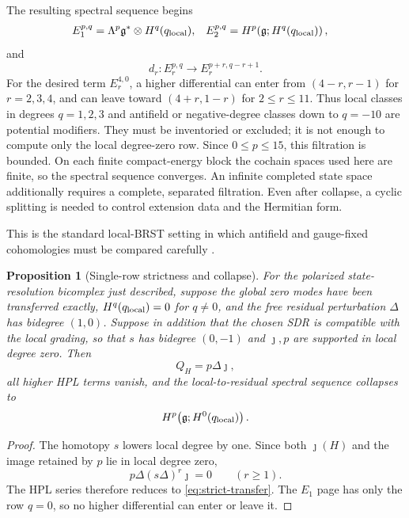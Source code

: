 \documentclass[11pt]{article}
\newtheorem{proposition}[theorem]{Proposition}
\theoremstyle{definition}
\theoremstyle{remark}
\newcommand{\g}{\mathfrak g}
\begin{document}
The resulting spectral sequence begins
\begin{align}\label{eq:spectral-pages}
 E_1^{p,q}
 &=\Lambda^p\g^*\otimes H^q(q_{\rm local}),
 &E_2^{p,q}
 &=H^p\!\left(\g;H^q(q_{\rm local})\right),
\end{align}
and
\begin{equation}\label{eq:spectral-bidegree}
 d_r:E_r^{p,q}\longrightarrow E_r^{p+r,q-r+1}.
\end{equation}
For the desired term $E_r^{4,0}$, a higher differential can enter from
$(4-r,r-1)$ for $r=2,3,4$, and can leave toward $(4+r,1-r)$ for
$2\le r\le11$.  Thus local classes in degrees $q=1,2,3$ and antifield or
negative-degree classes down to $q=-10$ are potential modifiers.  They must
be inventoried or excluded; it is not enough to compute only the local
degree-zero row.  Since $0\le p\le15$, this filtration is bounded.  On each
finite compact-energy block the cochain spaces used here are finite, so the
spectral sequence converges.  An infinite completed state space additionally
requires a complete, separated filtration.  Even after collapse, a cyclic
splitting is needed to control extension data and the Hermitian form.

This is the standard local-BRST setting in which antifield and gauge-fixed
cohomologies must be compared carefully
\cite{BarnichBrandtHenneaux,BarnichHenneauxHurthSkenderis}.

\begin{proposition}[Single-row strictness and collapse]
\label{prop:single-row}
For the polarized state-resolution bicomplex just described, suppose the
global zero modes have been transferred exactly,
$H^q(q_{\rm local})=0$ for $q\ne0$, and the free residual perturbation
$\Delta$ has bidegree $(1,0)$.  Suppose in addition that the chosen SDR is
compatible with the local grading, so that $s$ has bidegree $(0,-1)$ and
$\jmath,p$ are supported in local degree zero.  Then
\begin{equation}\label{eq:strict-transfer}
 \boxed{Q_H=p\Delta\jmath,}
\end{equation}
all higher HPL terms vanish, and the local-to-residual spectral sequence
collapses to
\begin{equation}
 H^p\!\left(\g;H^0(q_{\rm local})\right).
\end{equation}
\end{proposition}

\begin{proof}
The homotopy $s$ lowers local degree by one.  Since both $\jmath(H)$ and the
image retained by $p$ lie in local degree zero,
\begin{equation}
 p\Delta(s\Delta)^r\jmath=0\qquad(r\ge1).
\end{equation}
The HPL series therefore reduces to \eqref{eq:strict-transfer}.  The
$E_1$ page has only the row $q=0$, so no higher differential can enter or
leave it.
\end{proof}
\end{document}
